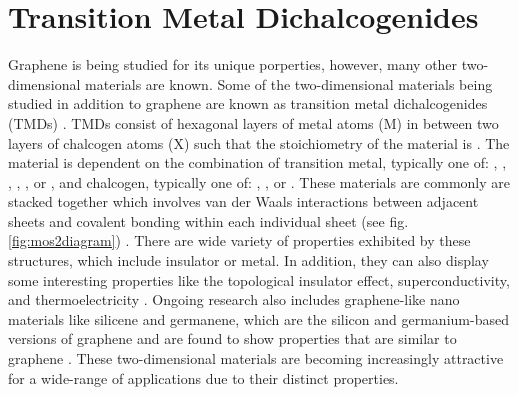 \documentclass[%
 reprint,
 amsmath,amssymb,
 aps,
pra,
floatfix,
]{revtex4-1}
\begin{document}
\section{\label{sec:TMDs} Transition Metal Dichalcogenides}
Graphene is being studied for its unique porperties, however, many other two-dimensional materials are known. Some of the two-dimensional materials being studied in addition to graphene are known as transition metal dichalcogenides (TMDs) \cite{Mattheiss1973, Wilson1969}. TMDs consist of hexagonal layers of metal atoms (M) in between two layers of chalcogen atoms (X) such that the stoichiometry of the material is  \cite{grapheneLike2Dreview2013}. The material is dependent on the combination of transition metal, typically one of: , , , , , or , and chalcogen, typically one of: , , or  \cite{Wilson1969}. These materials are commonly are stacked together which involves van der Waals interactions between adjacent sheets and covalent bonding within each individual sheet (see fig. \ref{fig:mos2diagram}) \cite{grapheneLike2Dreview2013}. There are wide variety of properties exhibited by these structures, which include insulator or metal. In addition, they can also display some interesting properties like the topological insulator effect, superconductivity, and thermoelectricity \cite{Lang2012, Zhang2012, Gamble1975, Xie2009}. Ongoing research also includes graphene-like nano materials like silicene and germanene, which are the silicon and germanium-based versions of graphene and are found to show properties that are similar to graphene \cite{Takeda1994, Cahangirov2009}. These two-dimensional materials are becoming increasingly attractive for a wide-range of applications due to their distinct properties. 
\end{document}
